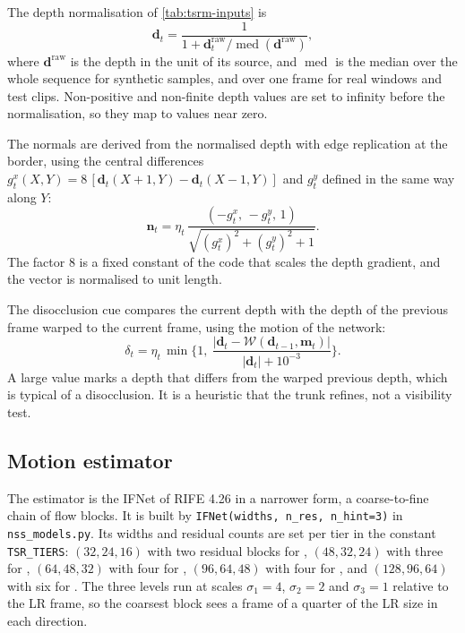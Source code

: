 The depth normalisation of \cref{tab:tsrm-inputs} is
\begin{equation}\label{eq:tsrm-depth}
\mathbf{d}_t=\frac{1}{1+\mathbf{d}^{\mathrm{raw}}_t/\operatorname{med}(\mathbf{d}^{\mathrm{raw}})},
\end{equation}
where $\mathbf{d}^{\mathrm{raw}}$ is the depth in the unit of its source, and $\operatorname{med}$ is the median over the whole sequence for synthetic samples, and over one frame for real windows and test clips. Non-positive and non-finite depth values are set to infinity before the normalisation, so they map to values near zero.

The normals are derived from the normalised depth with edge replication at the border, using the central differences $g^x_t(X,Y)=8\,[\mathbf{d}_t(X+1,Y)-\mathbf{d}_t(X-1,Y)]$ and $g^y_t$ defined in the same way along $Y$:
\begin{equation}\label{eq:tsrm-normal}
\mathbf{n}_t=\eta_t\,\frac{(-g^x_t,\,-g^y_t,\,1)}{\sqrt{(g^x_t)^2+(g^y_t)^2+1}}.
\end{equation}
The factor $8$ is a fixed constant of the code that scales the depth gradient, and the vector is normalised to unit length.

The disocclusion cue compares the current depth with the depth of the previous frame warped to the current frame, using the motion of the network:
\begin{equation}\label{eq:tsrm-disocc}
\delta_t=\eta_t\,\min\Big\{1,\ \frac{\lvert\mathbf{d}_t-\mathcal{W}(\mathbf{d}_{t-1},\mathbf{m}_t)\rvert}{\lvert\mathbf{d}_t\rvert+10^{-3}}\Big\}.
\end{equation}
A large value marks a depth that differs from the warped previous depth, which is typical of a disocclusion. It is a heuristic that the trunk refines, not a visibility test.

\subsection{Motion estimator}\label{sec:tsrm-motion}

The estimator is the IFNet of RIFE 4.26 \cite{huang2022rife} in a narrower form, a coarse-to-fine chain of flow blocks. It is built by \texttt{IFNet(widths, n\_res, n\_hint=3)} in \texttt{nss\_models.py}. Its widths and residual counts are set per tier in the constant \texttt{TSR\_TIERS}: $(32,24,16)$ with two residual blocks for , $(48,32,24)$ with three for , $(64,48,32)$ with four for , $(96,64,48)$ with four for , and $(128,96,64)$ with six for . The three levels run at scales $\sigma_1=4$, $\sigma_2=2$ and $\sigma_3=1$ relative to the LR frame, so the coarsest block sees a frame of a quarter of the LR size in each direction.

